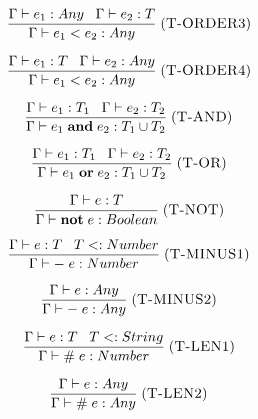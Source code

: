 \documentclass[12pt]{article}
\newcommand{\mylabel}[1]{\; (\textsc{#1})}
\newcommand{\subtype}{<:}
\newcommand{\kw}[1]{\mathbf{#1} \;}
\newcommand{\env}{\Gamma}
\begin{document}
\[
\frac{\env \vdash e_{1}:Any \;\;\;
      \env \vdash e_{2}:T}
     {\env \vdash e_{1} < e_{2} : Any}
\mylabel{T-ORDER3}
\]

\[
\frac{\env \vdash e_{1}:T \;\;\;
      \env \vdash e_{2}:Any}
     {\env \vdash e_{1} < e_{2} : Any}
\mylabel{T-ORDER4}
\]

\[
\frac{\env \vdash e_{1}:T_{1} \;\;\;
      \env \vdash e_{2}:T_{2}}
     {\env \vdash e_{1} \; \kw{and} e_{2} : T_{1} \cup T_{2}}
\mylabel{T-AND}
\]

\[
\frac{\env \vdash e_{1}:T_{1} \;\;\;
      \env \vdash e_{2}:T_{2}}
     {\env \vdash e_{1} \; \kw{or} e_{2} : T_{1} \cup T_{2}}
\mylabel{T-OR}
\]

\[
\frac{\env \vdash e:T}
     {\env \vdash \kw{not} e : Boolean}
\mylabel{T-NOT}
\]

\[
\frac{\env \vdash e:T \;\;\;
      T \subtype Number}
     {\env \vdash - \; e : Number}
\mylabel{T-MINUS1}
\]

\[
\frac{\env \vdash e:Any}
     {\env \vdash - \; e : Any}
\mylabel{T-MINUS2}
\]

\[
\frac{\env \vdash e:T \;\;\;
      T \subtype String}
     {\env \vdash \# \; e : Number}
\mylabel{T-LEN1}
\]

\[
\frac{\env \vdash e:Any}
     {\env \vdash \# \; e : Any}
\mylabel{T-LEN2}
\]
\end{document}
